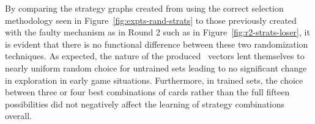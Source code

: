 By comparing the strategy graphs created from using the correct selection
methodology seen in Figure~\ref{fig:expts-rand-strats}
to those previously created with the faulty mechanism as in Round 2
such as in Figure~\ref{fig:r2-strats-loser},
it is evident that there is no functional difference between these two
randomization techniques.
%
As expected,
the nature of the produced \pvec\ vectors lent themselves to nearly uniform random
choice for untrained sets leading to no significant change in exploration in
early game situations.
%
Furthermore,
in trained sets,
the choice between three or four best combinations of cards rather than
the full fifteen possibilities did not negatively affect the learning of
strategy combinations overall.



